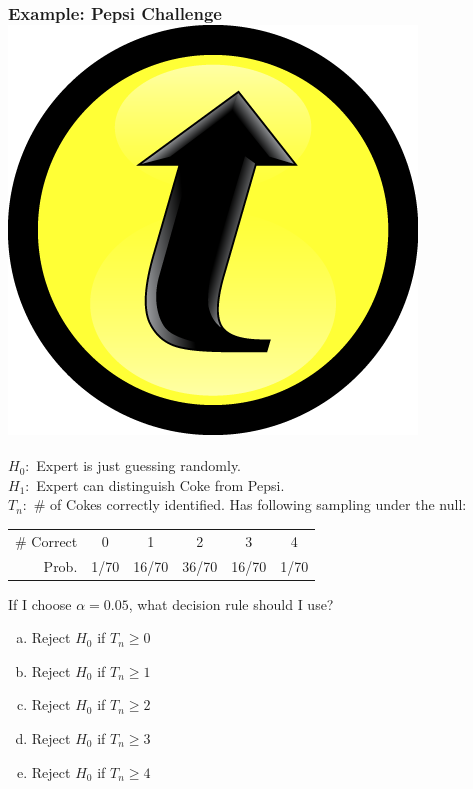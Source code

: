 \documentclass[handout]{beamer}
\begin{document}
\begin{frame}
\frametitle{Example: Pepsi Challenge \hfill \includegraphics[scale = 0.05]{./images/clicker}}
\footnotesize 
$H_0\colon$ Expert is just guessing randomly.\\
$H_1\colon$ Expert can distinguish Coke from Pepsi.\\
$T_n\colon$ \# of Cokes correctly identified. Has following sampling under the null:
		\begin{center}
		\begin{tabular}{rccccc}
		\hline \footnotesize
		\# Correct & 0 & 1 & 2 & 3 & 4\\
		Prob.&1/70 & 16/70 & 36/70 & 16/70 &1/70\\
		\hline
		\end{tabular}
	\end{center}
	\vspace{2em}
	\normalsize
	\alert{If I choose $\alpha =0.05$, what decision rule should I use?}
	\begin{enumerate}[(a)]
		\item Reject $H_0$ if $T_n \geq 0$
		\item Reject $H_0$ if $T_n \geq 1$
		\item Reject $H_0$ if $T_n \geq 2$
		\item Reject $H_0$ if $T_n \geq 3$
		\item Reject $H_0$ if $T_n \geq 4$
	\end{enumerate}
\end{frame}
\end{document}
